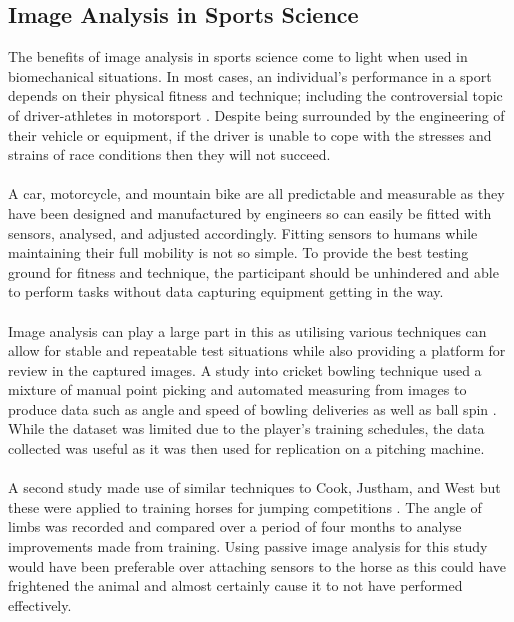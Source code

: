 \newcommand{\ignore}[1]{}
\subsection{Image Analysis in Sports Science}
	The benefits of image analysis in sports science come to light when used in biomechanical situations. In most cases, an individual's performance in a sport depends on their physical fitness and technique; including the controversial topic of driver-athletes in motorsport \ignore{Cite something}. Despite being surrounded by the engineering of their vehicle or equipment, if the driver is unable to cope with the stresses and strains of race conditions then they will not succeed. 
	\\\\
	A car, motorcycle, and mountain bike are all predictable and measurable as they have been designed and manufactured by engineers so can easily be fitted with sensors, analysed, and adjusted accordingly\ignore{Cite}. Fitting sensors to humans while maintaining their full mobility is not so simple. To provide the best testing ground for fitness and technique, the participant should be unhindered and able to perform tasks without data capturing equipment getting in the way.
	\\\\
	Image analysis can play a large part in this as utilising various techniques can allow for stable and repeatable test situations while also providing a platform for review in the captured images. A study into cricket bowling technique used a mixture of manual point picking and automated measuring from images to produce data such as angle and speed of bowling deliveries as well as ball spin \citep{cricketimaging}. While the dataset was limited due to the player's training schedules, the data collected was useful as it was then used for replication on a pitching machine.
	\\\\
	A second study made use of similar techniques to Cook, Justham, and West but these were applied to training horses for jumping competitions \citep{jumpyhorses}. The angle of limbs was recorded and compared over a period of four months to analyse improvements made from training. Using passive image analysis for this study would have been preferable over attaching sensors to the horse as this could have frightened the animal and almost certainly cause it to not have performed effectively.